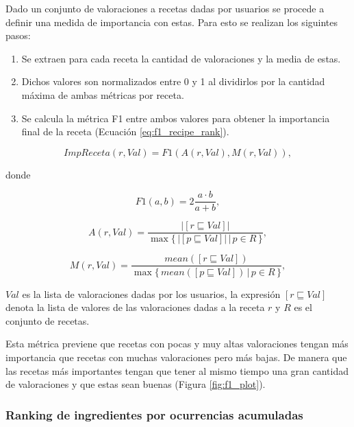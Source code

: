 \documentclass[
	a4paper, %
	10pt, %
	unnumberedsections, %
	twoside, %
]{LTJournalArticle}
\begin{document}
Dado un conjunto de valoraciones a recetas dadas por usuarios se procede a definir 
una medida de importancia con estas. Para esto se realizan los siguintes pasos:

\begin{enumerate}
	\item Se extraen para cada receta la cantidad de valoraciones y la media de estas.
	\item Dichos valores son normalizados entre 0 y 1 al dividirlos por la cantidad máxima de ambas métricas por receta.
	\item Se calcula la métrica F1 entre ambos valores para obtener la importancia final de la receta (Ecuación \ref{eq:f1_recipe_rank}).
\end{enumerate}

\begin{equation}
	ImpReceta(r, Val) = F1(A(r, Val), M(r, Val)),
	\label{eq:f1_recipe_rank}
\end{equation}

donde

\begin{equation*}
	F1(a, b) = 2 \frac{a · b}{a + b},
\end{equation*}

\begin{equation*}
	A(r, Val) = \frac{|[r \sqsubseteq Val]|}{\max \{\,|[p \sqsubseteq Val]| \, \vert \, p \in R \, \}},
\end{equation*}

\begin{equation*}
	M(r, Val) = \frac{mean([r \sqsubseteq Val])}{\max \{\,mean([p \sqsubseteq Val]) \, \vert \, p \in R\,\}},
\end{equation*}

$Val$ es la lista de valoraciones dadas por los usuarios, la expresión $[r \sqsubseteq Val]$ denota la lista de valores de 
las valoraciones dadas a la receta $r$ y $R$ es el conjunto de recetas.

Esta métrica previene que recetas con pocas y muy altas valoraciones tengan más importancia que recetas con muchas
valoraciones pero más bajas. De manera que las recetas más importantes tengan que tener al mismo tiempo una gran 
cantidad de valoraciones y que estas sean buenas (Figura \ref{fig:f1_plot}). 

\subsubsection{Ranking de ingredientes por ocurrencias acumuladas}
\end{document}
